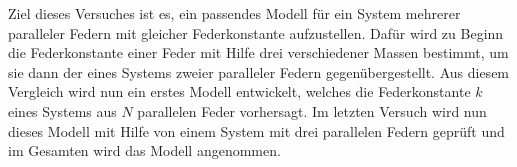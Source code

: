 \label{sec:zusammenfassung}


Ziel dieses Versuches ist es, ein passendes Modell für ein System mehrerer paralleler Federn mit gleicher Federkonstante aufzustellen. Dafür wird zu Beginn die Federkonstante einer Feder mit Hilfe drei verschiedener Massen bestimmt, um sie dann der eines Systems zweier paralleler Federn gegenübergestellt. Aus diesem Vergleich wird nun ein erstes Modell entwickelt, welches die Federkonstante $k$ eines Systems aus $N$ parallelen Feder vorhersagt. Im letzten Versuch wird nun dieses Modell mit Hilfe von einem System mit drei parallelen Federn geprüft und im Gesamten wird das Modell angenommen.

